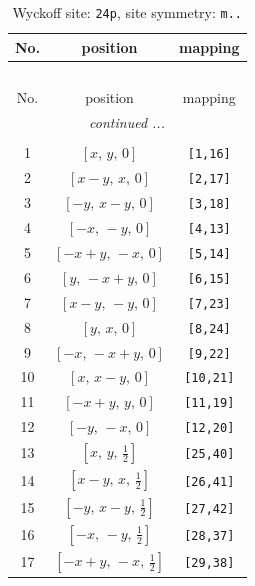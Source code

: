 \documentclass[fleqn,8pt]{jsarticle}
\begin{document}
\begin{longtable}{ccc}
\caption{Wyckoff site: {\tt 24p}, site symmetry: {\tt m..}}
 \\
 \hline \hline
No. & position & mapping \\ \hline \endfirsthead

\multicolumn{2}{l}{\tablename\ \thetable{}} \\
 \hline \hline
No. & position & mapping \\ \hline \endhead

 \hline \hline
\multicolumn{2}{r}{\footnotesize\it continued ...} \\ \endfoot

 \hline \hline
\multicolumn{2}{r}{} \\ \endlastfoot

1 & $\left[ x,\, y,\, 0 \right]$ & {\tt [1,16]} \\ \hline
2 & $\left[ x - y,\, x,\, 0 \right]$ & {\tt [2,17]} \\ \hline
3 & $\left[ - y,\, x - y,\, 0 \right]$ & {\tt [3,18]} \\ \hline
4 & $\left[ - x,\, - y,\, 0 \right]$ & {\tt [4,13]} \\ \hline
5 & $\left[ - x + y,\, - x,\, 0 \right]$ & {\tt [5,14]} \\ \hline
6 & $\left[ y,\, - x + y,\, 0 \right]$ & {\tt [6,15]} \\ \hline
7 & $\left[ x - y,\, - y,\, 0 \right]$ & {\tt [7,23]} \\ \hline
8 & $\left[ y,\, x,\, 0 \right]$ & {\tt [8,24]} \\ \hline
9 & $\left[ - x,\, - x + y,\, 0 \right]$ & {\tt [9,22]} \\ \hline
10 & $\left[ x,\, x - y,\, 0 \right]$ & {\tt [10,21]} \\ \hline
11 & $\left[ - x + y,\, y,\, 0 \right]$ & {\tt [11,19]} \\ \hline
12 & $\left[ - y,\, - x,\, 0 \right]$ & {\tt [12,20]} \\ \hline
13 & $\left[ x,\, y,\, \frac{1}{2} \right]$ & {\tt [25,40]} \\ \hline
14 & $\left[ x - y,\, x,\, \frac{1}{2} \right]$ & {\tt [26,41]} \\ \hline
15 & $\left[ - y,\, x - y,\, \frac{1}{2} \right]$ & {\tt [27,42]} \\ \hline
16 & $\left[ - x,\, - y,\, \frac{1}{2} \right]$ & {\tt [28,37]} \\ \hline
17 & $\left[ - x + y,\, - x,\, \frac{1}{2} \right]$ & {\tt [29,38]} \\ \hline

\end{longtable}
\end{document}
